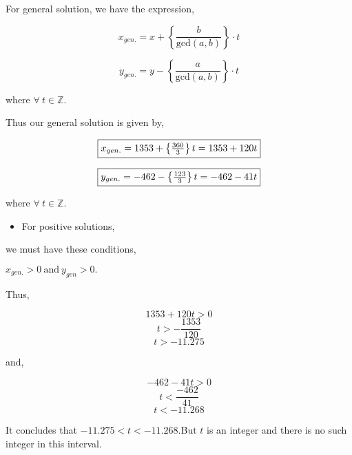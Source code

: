 \documentclass[a4paper,12pt]{article}
\begin{document}
    For general solution, we have the expression,

   
    $$x_{gen.} = x + \left\{\frac{b}{\mbox{gcd}(a,b)}\right\}\cdot t$$
    

    
    $$y_{gen.} = y - \left\{\frac{a}{\mbox{gcd}(a,b)}\right\}\cdot t$$

    where $\forall\ t\in \mathbb{Z}.$

    \vspace*{2mm}
    

    Thus our general solution is given by,

    \begin{align*}
        \boxed{$$x_{gen.} = 1353 + \left\{\frac{360}{3}\right\}t = 1353 + 120t$$} 
    \end{align*}
    
    \begin{align*}
        \boxed{$$y_{gen.} = -462 - \left\{\frac{123}{3}\right\}t = -462 - 41t$$}
    \end{align*}

    where $\forall\ t\in \mathbb{Z}$.

    \begin{itemize}
        \item For positive solutions,
    \end{itemize}
    \begin{center}
        we must have these conditions,
    \end{center}
    \vspace*{0.2cm}
    \begin{center}
        $x_{gen.} > 0\ \mbox{and}\ y_{gen} > 0.$
    \end{center}

    
    \vspace*{0.2mm}

    Thus,

    
    $$1353 + 120t  > 0 $$
    $$t  > -\frac{1353}{120} $$
    $$t  > -11.275$$
       
    and,

    $$-462 -41t  > 0$$
    $$t  < \frac{-462}{41}$$
    $$t  < -11.268$$

    \vspace*{3mm}

    It concludes that $-11.275<t<-11.268$.But $t$ is an integer and there is no such integer in this interval.

    \vspace*{4mm}
\end{document}
